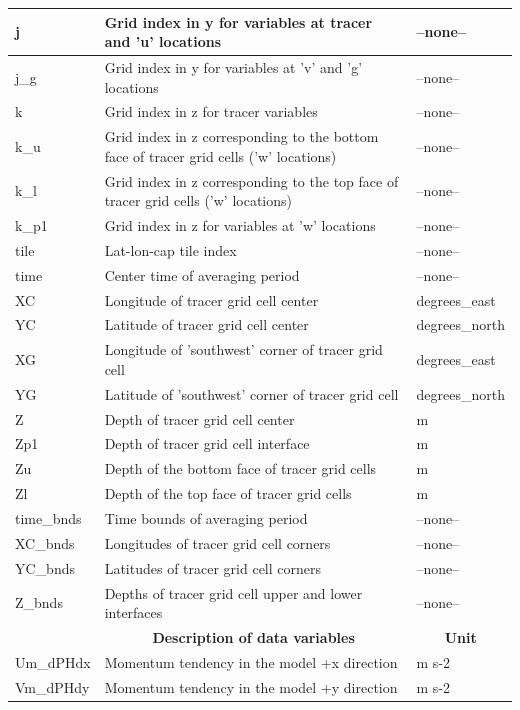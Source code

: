 \begin{longtable}{|m{}|m{}|m{}|}
j &Grid index in y for variables at tracer and 'u' locations &--none--  \\ \hline
j\_g &Grid index in y for variables at 'v' and 'g' locations &--none--  \\ \hline
k &Grid index in z for tracer variables &--none--  \\ \hline
k\_u &Grid index in z corresponding to the bottom face of tracer grid cells ('w' locations) &--none--  \\ \hline
k\_l &Grid index in z corresponding to the top face of tracer grid cells ('w' locations) &--none--  \\ \hline
k\_p1 &Grid index in z for variables at 'w' locations &--none--  \\ \hline
tile &Lat-lon-cap tile index &--none--  \\ \hline
time &Center time of averaging period &--none--  \\ \hline
XC &Longitude of tracer grid cell center &degrees\_east  \\ \hline
YC &Latitude of tracer grid cell center &degrees\_north  \\ \hline
XG &Longitude of 'southwest' corner of tracer grid cell &degrees\_east  \\ \hline
YG &Latitude of 'southwest' corner of tracer grid cell &degrees\_north  \\ \hline
Z &Depth of tracer grid cell center &m  \\ \hline
Zp1 &Depth of tracer grid cell interface &m  \\ \hline
Zu &Depth of the bottom face of tracer grid cells &m  \\ \hline
Zl &Depth of the top face of tracer grid cells &m  \\ \hline
time\_bnds &Time bounds of averaging period &--none--  \\ \hline
XC\_bnds &Longitudes of tracer grid cell corners &--none--  \\ \hline
YC\_bnds &Latitudes of tracer grid cell corners &--none--  \\ \hline
Z\_bnds &Depths of tracer grid cell upper and lower interfaces &--none--  \\ \hline
\rowcolor{lightgray} \multicolumn{1}{|c|}{\textbf{Variables}} & \multicolumn{1}{|c|}{\textbf{Description of data variables}} &  \multicolumn{1}{|c|}{\textbf{Unit}}\\ \hline
Um\_dPHdx &Momentum tendency in the model +x direction &m s-2  \\ \hline
Vm\_dPHdy &Momentum tendency in the model +y direction &m s-2  \\ \hline
\end{longtable}

